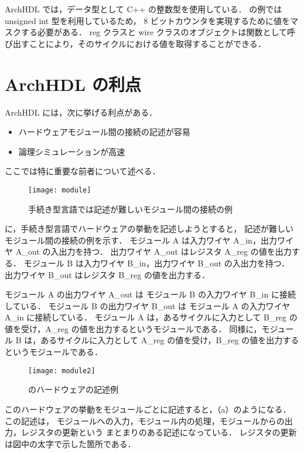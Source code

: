 ArchHDL では，データ型として C++ の整数型を使用している．
の例では unsigned int 型を利用しているため，
8 ビットカウンタを実現するために値をマスクする必要がある．
reg クラスと wire クラスのオブジェクトは関数として呼び出すことにより，そのサイクルにおける値を取得することができる．


\section{ArchHDL の利点}

ArchHDL には，次に挙げる利点がある．

\begin{itemize}
 \item ハードウェアモジュール間の接続の記述が容易
 \item 論理シミュレーションが高速
\end{itemize}
ここでは特に重要な前者について述べる．

\begin{figure}[t]
 \centering
 \texttt{[image: module]}
 \caption{手続き型言語では記述が難しいモジュール間の接続の例}
 \label{fig:module}
\end{figure}

 に，手続き型言語でハードウェアの挙動を記述しようとすると，
記述が難しいモジュール間の接続の例を示す．
モジュール A は入力ワイヤ A\_in，出力ワイヤ A\_out の入出力を持つ．
出力ワイヤ A\_out はレジスタ A\_reg の値を出力する．
モジュール B は入力ワイヤ B\_in，出力ワイヤ B\_out の入出力を持つ．
出力ワイヤ B\_out はレジスタ B\_reg の値を出力する．

モジュール A の出力ワイヤ A\_out は モジュール B の入力ワイヤ B\_in に接続している．
モジュール B の出力ワイヤ B\_out は モジュール A の入力ワイヤ A\_in に接続している．
モジュール A は，あるサイクルに入力として B\_reg の値を受け，A\_reg の値を出力するというモジュールである．
同様に，モジュール B は，あるサイクルに入力として A\_reg の値を受け，B\_reg の値を出力するというモジュールである．

\begin{figure}[t]
 \begin{center}
  \texttt{[image: module2]}
  \caption{ のハードウェアの記述例}
  \label{fig:module2}
 \end{center}
\end{figure}

このハードウェアの挙動をモジュールごとに記述すると，（a）のようになる．
この記述は，
モジュールへの入力，モジュール内の処理，モジュールからの出力，レジスタの更新という
まとまりのある記述になっている．
レジスタの更新は図中の太字で示した箇所である．

